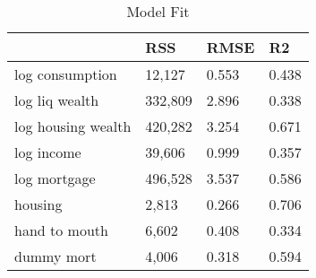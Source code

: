 \begin{table}[htbp]
\caption{\label{clabel} Model Fit}\centering\medskip
\begin{tabular}{llll} \hline \hline
 & RSS  & RMSE  & R2  \\  \hline 
log consumption &    12,127 &     0.553 &     0.438 \\  
log liq wealth &   332,809 &     2.896 &     0.338 \\  
log housing wealth &   420,282 &     3.254 &     0.671 \\  
log income &    39,606 &     0.999 &     0.357 \\  
log mortgage &   496,528 &     3.537 &     0.586 \\  
housing &     2,813 &     0.266 &     0.706 \\  
hand to mouth &     6,602 &     0.408 &     0.334 \\  
dummy mort &     4,006 &     0.318 &     0.594 \\  
\hline \hline \end{tabular}
\end{table}
